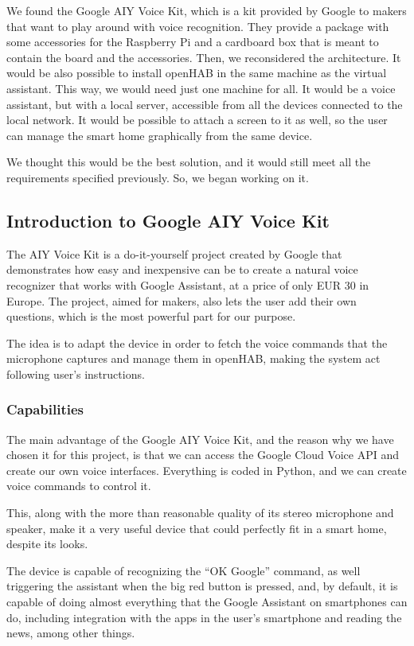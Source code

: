We found the Google AIY Voice Kit, which is a kit provided by Google to makers that want to play around with voice recognition.
They provide a package with some accessories for the Raspberry Pi and a cardboard box that is meant to contain the board and the
accessories. Then, we reconsidered the architecture. It would be also possible to install openHAB in the same machine as the virtual
assistant. This way, we would need just one machine for all. It would be a voice assistant, but with a local server, accessible from
all the devices connected to the local network. It would be possible to attach a screen to it as well, so the user can manage the
smart home graphically from the same device.

We thought this would be the best solution, and it would still meet all the requirements specified previously. So, we began working
on it.

\subsection{Introduction to Google AIY Voice Kit}
The AIY Voice Kit is a do-it-yourself project created by Google that demonstrates how easy and inexpensive can be to create a natural
voice recognizer that works with Google Assistant, at a price of only EUR 30 in Europe. The project, aimed for makers, also lets the
user add their own questions, which is the most powerful part for our purpose.

The idea is to adapt the device in order to fetch the voice commands that the microphone captures and manage them in openHAB,
making the system act following user’s instructions.

\subsubsection{Capabilities}
The main advantage of the Google AIY Voice Kit, and the reason why we have chosen it for this project, is that we can access the
Google Cloud Voice API and create our own voice interfaces. Everything is coded in Python, and we can create voice commands to
control it.

This, along with the more than reasonable quality of its stereo microphone and speaker, make it a very useful device that could
perfectly fit in a smart home, despite its looks.

The device is capable of recognizing the “OK Google” command, as well triggering the assistant when the big red button is pressed,
and, by default, it is capable of doing almost everything that the Google Assistant on smartphones can do, including integration
with the apps in the user’s smartphone and reading the news, among other things.

